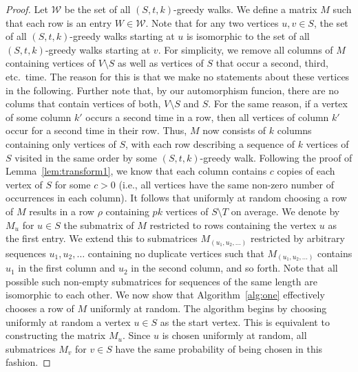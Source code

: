 {\begin{proof} 
    Let $\mathcal{W}$ be the set of all $(S, t, k)$-greedy walks. We define a
    matrix $M$ such that each row is an entry $W \in \mathcal{W}$. Note that for
    any two vertices $u, v \in S$, the set of all $(S, t, k)$-greedy walks
    starting at $u$ is isomorphic to the set of all $(S, t, k)$-greedy walks
    starting at $v$.
%
    {For simplicity, we remove all columns of $M$ containing vertices of
     $V \setminus S$ as well as vertices of $S$ that occur a second, third, etc.\ time. 
     The reason for this is that we make no statements about these vertices in the
following.
     {Further note} that, by our automorphism funcion, there are no colums that
contain vertices of both, $V \setminus S$ and $S$. For the same reason, if a vertex
of some column $k'$ occurs a second time in a row, then all vertices of
column $k'$ occur for a second time in their row.}
%
% 
%
    {Thus,}
    $M$ now {consists of} $k$ columns containing only vertices of $S$, with each row
    describing a sequence of $k$ vertices of $S$ visited {in the
    same order} by some $(S, t, k)$-greedy
    walk. Following the proof of Lemma~\ref{lem:transform1}, we know that each
    column contains $c$ copies of each vertex of $S$ for some $c > 0$ (i.e., all
    vertices have the same non-zero number of occurrences in each column). It
    follows that uniformly at random choosing a row of $M$ results in
    {a row} $\rho$ containing $p k$ vertices of $S \setminus T$ on average. We denote by
    $M_{u}$ for $u \in S$ the submatrix of $M$ restricted to rows containing the vertex $u$
    as the first entry. We extend this to submatrices $M_{(u_1, u_2, \ldots)}$
    restricted by arbitrary sequences $u_1, u_2, \ldots$ containing no duplicate
    vertices such that $M_{(u_1, u_2, \ldots)}$ contains $u_1$ in the first column
    and $u_2$ in the second column, and so forth.
%
    Note that all possible such non-empty submatrices for sequences of the same
    length are isomorphic to each other. We now show that Algorithm~\ref{alg:one}
    effectively chooses a row of $M$ uniformly at random. The algorithm begins by
    choosing uniformly at random a vertex $u \in S$ as the start vertex. This is
    equivalent to constructing the matrix $M_u$. Since $u$ is chosen uniformly at
    random, all submatrices $M_{v}$ for $v \in S$ have the same probability of being chosen
    in this fashion.
    

\end{proof}}
